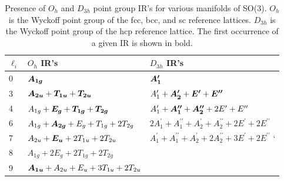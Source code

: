 \documentclass[preprint]{revtex4}
\newcommand{\mb}[1]{\ensuremath{\mbox{\boldmath $ #1 $}}}
\begin{document}
\begin{table}[!ht]
\caption{Presence of $O_h$ and $D_{3h}$ point group IR's for various
manifolds of SO(3). $O_h$ is the Wyckoff point group of the fcc,
bcc, and sc reference lattices. $D_{3h}$ is the Wyckoff point group
of the hcp reference lattice. The first occurrence of a given IR is
shown in bold.}\label{wyckoff_IRs}\small
\begin{tabular}{lll}\hline
$\ell_i$ & $O_h$ IR's &  $D_{3h}$ IR's \\
\hline
0 & $\mb{A_{1g}}$ & $\mb{A^\prime_1}$ \\
3 & $\mb{A_{2u}}+\mb{T_{1u}}+\mb{T_{2u}}$ & $A^\prime_1+\mb{A^{\prime}_2}+\mb{E^\prime}+\mb{E^{\prime\prime}}$ \\
4 & $A_{1g}+\mb{E_{g}}+\mb{T_{1g}}+\mb{T_{2g}}$ & $A^\prime_1+\mb{A^{\prime\prime}_1}+\mb{A^{\prime\prime}_2}+2E^\prime+E^{\prime\prime}$\\
6 & $A_{1g}+\mb{A_{2g}}+E_g+T_{1g}+2T_{2g}$ & $2A^\prime_1+A^{\prime\prime}_1+A^{\prime}_2+A^{\prime\prime}_2+2E^\prime+2E^{\prime\prime}$ \\
7 & $A_{2u}+\mb{E_u}+2T_{1u}+2T_{2u}$ & $A^\prime_1+A^{\prime\prime}_1+A^{\prime}_2+2A^{\prime\prime}_2+3E^\prime+2E^{\prime\prime}$ `\\
8 & $A_{1g}+2E_g+2T_{1g}+2T_{2g}$ & \\
9 & $\mb{A_{1u}}+A_{2u}+E_u+3T_{1u}+2T_{2u}$ & \\
\hline
\end{tabular}
\end{table}

\pagebreak
\end{document}
